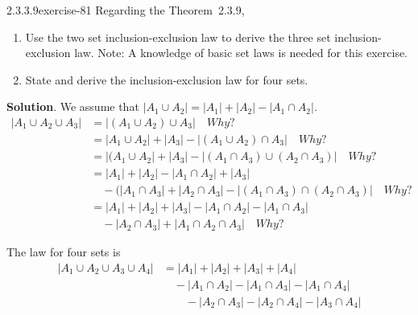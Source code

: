 \documentclass[twoside,10pt,]{book}
\numberwithin{equation}{section}
\begin{document}
\begin{divisionsolution}{2.3.3.9}{}{exercise-81}%
\hypertarget{p-762}{}%
Regarding the Theorem~2.3.9,\leavevmode%
\begin{enumerate}[label=(\alph*)]
\item\hypertarget{li-457}{}\hypertarget{p-763}{}%
Use the two set inclusion-exclusion law  to derive the  three set inclusion-exclusion law. Note: A knowledge of basic set laws is needed for this exercise.%
\item\hypertarget{li-458}{}\hypertarget{p-764}{}%
State and derive the inclusion-exclusion law for four sets.%
\end{enumerate}
%
\par\smallskip%
\noindent\textbf{Solution}.\quad%
\hypertarget{p-765}{}%
We assume that \(\lvert A_1 \cup A_2 \rvert = \lvert A_1 \rvert +\lvert  A_2\rvert  -\lvert A_1\cap A_2\rvert   \).%
\begin{equation*}
\begin{split}
\lvert A_1 \cup A_2\cup A_3 \rvert  &  =\lvert (A_1\cup A_2) \cup A_3 \rvert   \quad  Why?\\
& = \lvert A_1\cup A_2\rvert   +\lvert  A_3 \rvert  -\lvert (A_1\cup A_2)\cap A_3\rvert \quad Why? \\
& =\lvert (A_1\cup A_2\rvert   +\lvert  A_3\rvert  -\lvert (A_1\cap A_3)\cup (A_2\cap A_3)\rvert \quad Why?\\
& =\lvert  A_1\rvert  +\lvert  A_2\rvert  -\lvert A_1\cap A_2\rvert   +\lvert  A_3\rvert \\
& \quad -(\lvert A_1\cap A_3\rvert   +\lvert A_2\cap A_3\rvert   -\lvert (A_1\cap A_3)\cap (A_2\cap A_3)\rvert\quad Why?\\
& =\lvert  A_1\rvert  +\lvert  A_2\rvert  +\lvert  A_3\rvert  -\lvert A_1\cap A_2\rvert -\lvert A_1\cap A_3\rvert\\
& \quad  -\lvert A_2\cap A_3\rvert +\lvert A_1\cap A_2\cap A_3\rvert \quad Why?  
\end{split}
\end{equation*}
%
\par
\hypertarget{p-766}{}%
The law for four sets is%
\begin{equation*}
\begin{split}
\lvert A_1\cup A_2\cup A_3\cup A_4\rvert  & =\lvert  A_1\rvert  +\lvert  A_2\rvert  +\lvert  A_3\rvert  +\lvert  A_4\rvert\\
& \quad  -\lvert A_1\cap A_2\rvert  -\lvert A_1\cap A_3\rvert  -\lvert A_1\cap A_4\rvert \\
& \quad \quad -\lvert A_2\cap A_3\rvert   -\lvert A_2\cap A_4\rvert -\lvert A_3\cap A_4\rvert   \\

\end{split}
\end{equation*}
\end{divisionsolution}
\end{document}
